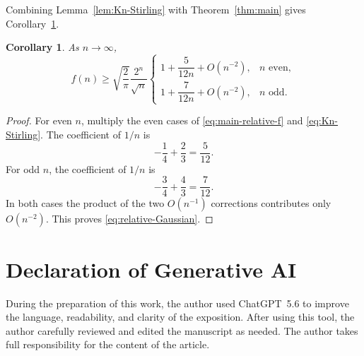 \documentclass[10pt]{amsart}
\newtheorem{corollary}[theorem]{Corollary}
\numberwithin{equation}{section}
\begin{document}
Combining Lemma~\ref{lem:Kn-Stirling} with Theorem~\ref{thm:main} gives
Corollary~\ref{cor:Gaussian}.

\begin{corollary}\label{cor:Gaussian}
As $n\to\infty$,
\begin{equation}\label{eq:relative-Gaussian}
 f(n)\ge\sqrt{\frac2\pi}\frac{2^n}{\sqrt n}
 \begin{cases}
  1+\dfrac{5}{12n}+O(n^{-2}),&n\text{ even},\\[6pt]
  1+\dfrac{7}{12n}+O(n^{-2}),&n\text{ odd}.
 \end{cases}
\end{equation}
\end{corollary}

\begin{proof}
For even $n$, multiply the even cases of \cref{eq:main-relative-f} and
\cref{eq:Kn-Stirling}.  The coefficient of $1/n$ is
\[
 -\frac14+\frac23=\frac5{12}.
\]
For odd $n$, the coefficient of $1/n$ is
\[
 -\frac34+\frac43=\frac7{12}.
\]
In both cases the product of the two $O(n^{-1})$ corrections contributes only
$O(n^{-2})$.  This proves \cref{eq:relative-Gaussian}.
\end{proof}

\section*{Declaration of Generative AI} During the preparation of this work, the author used ChatGPT~5.6 to improve the language, readability, and clarity of the exposition. After using this tool, the author carefully reviewed and edited the manuscript as needed. The author takes full responsibility for the content of the article.
\end{document}
